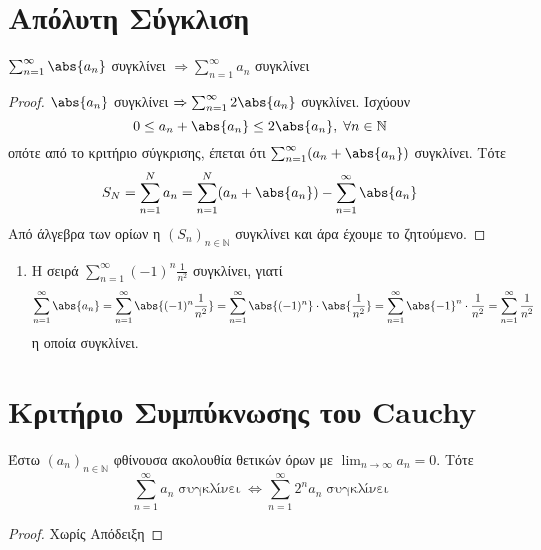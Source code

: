 \documentclass[main.tex]{subfiles}
\begin{document}
\section{Απόλυτη Σύγκλιση}

\begin{prop}
    $ \sum_{n=1}^{\infty} \abs{a_{n}} $ συγκλίνει 
    $ \Rightarrow \sum_{n=1}^{\infty} a_{n} $ συγκλίνει 
\end{prop}
\begin{proof}
    $ \abs{a_{n}} $ συγκλίνει $ \Rightarrow \sum_{n=1}^{\infty} 2 \abs{a_{n}} $ 
    συγκλίνει. Ισχύουν
    \[
        0 \leq a_{n} + \abs{a_{n}} \leq 2 \abs{a_{n}}, \; \forall n \in \mathbb{N} 
    \] 
    οπότε από το κριτήριο σύγκρισης, έπεται ότι $ \sum_{n=1}^{\infty} (a_{n}+ 
    \abs{a_{n}}) $ συγκλίνει. Τότε
    \[
        S_{N} = \sum_{n=1}^{N} a_{n} = \sum_{n=1}^{N} (a_{n}+ \abs{a_{n}}) - 
        \sum_{n=1}^{\infty} \abs{a_{n}}   
    \] 
    Από άλγεβρα των ορίων η $ {(S_{n})}_{n \in \mathbb{N}} $ συγκλίνει και άρα 
    έχουμε το ζητούμενο.
\end{proof}

\begin{examples}
\item {}
    \begin{enumerate}
        \item Η σειρά $ \sum_{n=1}^{\infty} (-1)^{n} \frac{1}{n^{2}} $ συγκλίνει, 
            γιατί 
            \[ 
                \sum_{n=1}^{\infty} \abs{a_{n}} = \sum_{n=1}^{\infty} \abs{(-1)^{n}
                \frac{1}{n^{2}}} = \sum_{n=1}^{\infty} \abs{(-1)^{n}} 
                \cdot \abs{\frac{1}{n^{2}} } =  
                \sum_{n=1}^{\infty} \abs{-1}^{n} \cdot 
                \frac{1}{n^{2}} = \sum_{n=1}^{\infty} \frac{1}{n^{2}} 
            \]
            η οποία συγκλίνει.
    \end{enumerate}
\end{examples}

\section{Κριτήριο Συμπύκνωσης του Cauchy}

\begin{prop}
    Έστω $ {(a_{n})}_{n \in \mathbb{N}} $ φθίνουσα ακολουθία θετικών όρων με 
    $ \lim_{n \to \infty} a_{n} =0 $. Τότε
    \[
        \sum_{n=1}^{\infty} a_{n} \; \text{συγκλίνει} \; 
        \Leftrightarrow \sum_{n=1}^{\infty} 2^{n} a_{n} \; \text{συγκλίνει}
    \] 
\end{prop}
\begin{proof}
    Χωρίς Απόδειξη
\end{proof}
\end{document}
